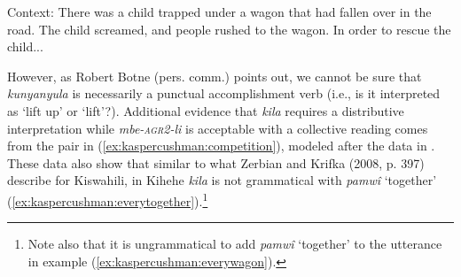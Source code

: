\documentclass[output=paper,modfonts,nonflat]{langsci/langscibook}
\begin{document}
\begin{exe}

 \ex Context: There was a child trapped under a wagon that had fallen over in the road. The child screamed, and people rushed to the wagon. In order to rescue the child... \label{ex:kaspercushman:wagon}

\begin{xlist}
\end{xlist}
\end{exe}


However, as Robert Botne (pers. comm.) points out, we cannot be sure that \textit{kunyanyula} is necessarily a punctual accomplishment verb (i.e., is it interpreted as `lift up' or `lift'?). Additional evidence that \textit{kila} requires a distributive interpretation while \textit{mbe-\textsc{agr2}-li} is acceptable with a collective reading comes from the pair in (\ref{ex:kaspercushman:competition}), modeled after the data in \citealt[396--397]{zerbian08}. These data also show that similar to what Zerbian and Krifka (2008, p. 397) describe for Kiswahili, in Kihehe \textit{kila} is not grammatical with \textit{pamw\^i} `together' (\ref{ex:kaspercushman:everytogether}).\footnote{Note also that it is ungrammatical to add \textit{pamw\^i} `together' to the utterance in example (\ref{ex:kaspercushman:everywagon}).\label{foot:kaspercushman:competition}}


\begin{exe}
\ex  \label{ex:kaspercushman:competition} \begin{xlist}

\end{xlist}
\end{exe}
\end{document}
